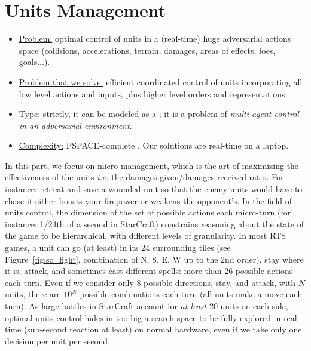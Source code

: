 \section{Units Management}
\begin{itemize}
\item \underline{Problem:} optimal control of units in a (real-time) huge adversarial actions space (collisions, accelerations, terrain, damages, areas of effects, foes, goals...).
\item \underline{Problem that we solve:} efficient coordinated control of units incorporating all low level actions and inputs, plus higher level orders and representations.
\item \underline{Type:} strictly, it can be modeled as a ; it is a problem of \textit{multi-agent control in an adversarial environment}.
\item \underline{Complexity:} PSPACE-complete \citep{Papadimitriou87,GamingComplexity}. Our solutions are real-time on a laptop.
\end{itemize}


In this part, we focus on micro-management, which is the art of maximizing the effectiveness of the units \textit{i.e.} the damages given/damages received ratio. For instance: retreat and save a wounded unit so that the enemy units would have to chase it either boosts your firepower or weakens the opponent's. 
In the field of units control, the dimension of the set of possible actions each micro-turn (for instance: 1/24th of a second in StarCraft) constrains reasoning about the state of the game to be hierarchical, with different levels of granularity. In most RTS games, a unit can go (at least) in its 24 surrounding tiles (see Figure~\ref{fig:sc_fight}, combination of N, S, E, W up to the 2nd order), 
stay where it is, attack, and sometimes cast different spells: more than 26 possible actions each turn. Even if we consider only 8 possible directions, stay, and attack, with $N$ units, there are $10^N$ possible combinations each turn (all units make a move each turn). As large battles in StarCraft account for \textit{at least} 20 units on each side, optimal units control hides in too big a search space to be fully explored in real-time (sub-second reaction at least) on normal hardware, even if we take only one decision per unit per second.

